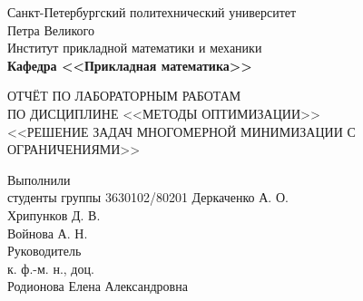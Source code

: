 \documentclass[main.tex]{subfiles}
\begin{document}
\begin{titlepage}
\begin{center}
	\begin{large}
		Санкт-Петербургский политехнический университет\\ Петра Великого\\		
		\vspace{\baselineskip}
		Институт прикладной математики и механики\\
		\textbf{Кафедра <<Прикладная математика>>}\\
	\end{large}
	\vfill
	\Large{{ОТЧЁТ ПО ЛАБОРАТОРНЫМ РАБОТАМ\\
	ПО ДИСЦИПЛИНЕ <<МЕТОДЫ ОПТИМИЗАЦИИ>>\\ <<РЕШЕНИЕ ЗАДАЧ МНОГОМЕРНОЙ МИНИМИЗАЦИИ С ОГРАНИЧЕНИЯМИ>>}}
\end{center}
\vfill
\flushleft
Выполнили\\
студенты группы 3630102/80201
\flushright
Деркаченко А. О.\\
Хрипунков Д. В.\\
Войнова А. Н.\\ 
\flushleft
Руководитель\\
к. ф.-м. н., доц.\\
\flushright
Родионова Елена Александровна
\vfill
{}
\end{titlepage}
\end{document}
